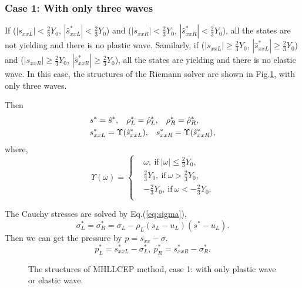 \documentclass{article}
\numberwithin{equation}{section}
\numberwithin{table}{section}
\begin{document}
\subsubsection{Case 1: With only three waves}\label{sec:case1}
%
If ($|s_{xxL}|<\frac{2}{3}Y_0$, $|\hat{s}_{xxL}^*| < \frac{2}{3}Y_0$)  and  ($|s_{xxR}|<\frac{2}{3}Y_0$, $|\hat{s}_{xxR}^*| < \frac{2}{3}Y_0$), all the states are not yielding and there is no plastic wave. Samilarly, if ($|s_{xxL}|  \ge \frac{2}{3}Y_0$, $|\hat{s}_{xxL}^*| \ge  \frac{2}{3}Y_0$)  and  ($|s_{xxR}| \ge \frac{2}{3}Y_0$, $|\hat{s}_{xxR}^*| \ge  \frac{2}{3}Y_0$), all the states are yielding and there is no elastic wave.
In this case, the structures  of the Riemann solver are shown in Fig.\ref{fig:case1}, with only three waves.

Then
\begin{align}
&  s^* = \hat{s}^*,\hspace{0.3cm} \rho^*_L = \hat{\rho}_L^*, \hspace{0.3cm} \rho_R^* = \hat{\rho}_R^*,\\
&  s_{xxL}^*  = \Upsilon(\hat{s}_{xxL}^*),\hspace{0.3cm} s_{xxR}^*  = \Upsilon(\hat{s}_{xxR}^*),
\end{align}
where,
\begin{equation}\label{eq:upsilon}
  \Upsilon(\omega) = \left\{ \begin{aligned}
	  &\omega, \  \text{if} \  |\omega| \le \frac{2}{3}Y_0,\\
	  &\frac{2}{3}Y_0,  \ \text{if} \  \omega > \frac{2}{3}Y_0,\\
	 &-\frac{2}{3}Y_0,  \  \text{if} \ \omega < -\frac{2}{3}Y_0.\\
 \end{aligned}\right.
 \end{equation}

 The Cauchy stresses are solved  by Eq.(\ref{eq:sigma}),
\begin{equation*}
  \sigma_L^*=\sigma_R^*=\sigma_L -\rho_L (s_L-u_L)(s^*-u_L).
\end{equation*}
 Then we can get the pressure by $p =s_{xx}-\sigma$.
\begin{equation}
  p_L^* = s_{xxL}^* - \sigma_L^*,  \  p_R^* = s_{xxR}^* - \sigma_R^*.
\end{equation}

\begin{figure}
  \centering
\caption{The  structures of MHLLCEP method, case 1: with only plastic wave or elastic wave.}
\label{fig:case1}
\end{figure}
\end{document}
